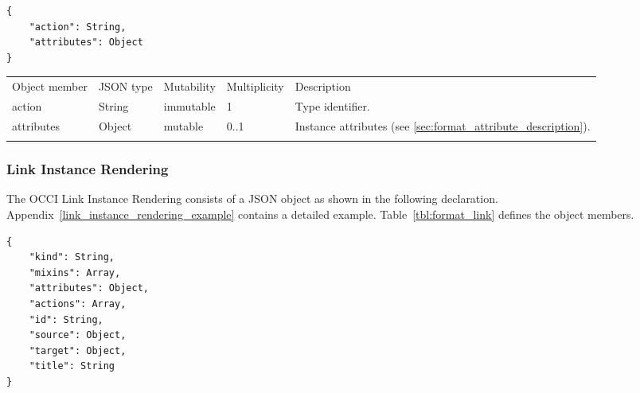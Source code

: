 \documentclass[10pt,a4paper]{article}
\begin{document}
\begin{lstlisting}
{
    "action": String,
    "attributes": Object
}
\end{lstlisting}

 {
    \begin{tabularx}{\textwidth}{llllX}
    \toprule
    Object member   & JSON type   & Mutability  & Multiplicity  & Description \\
    \colrule
    action          & String      & immutable   & 1             & Type identifier. \\

    attributes      & Object      & mutable     & 0..1          & Instance attributes (see \ref{sec:format_attribute_description}). \\
    \botrule
    \end{tabularx}
}


\subsubsection{Link Instance Rendering}
\label{sec:format_link}

The OCCI Link Instance Rendering consists of a JSON object as shown in the
following declaration. Appendix~\ref{link_instance_rendering_example} contains a detailed example.
Table~\ref{tbl:format_link} defines the object members.
\begin{lstlisting}
{
    "kind": String,
    "mixins": Array,
    "attributes": Object,
    "actions": Array,
    "id": String,
    "source": Object,
    "target": Object,
    "title": String
}
\end{lstlisting}
\end{document}
